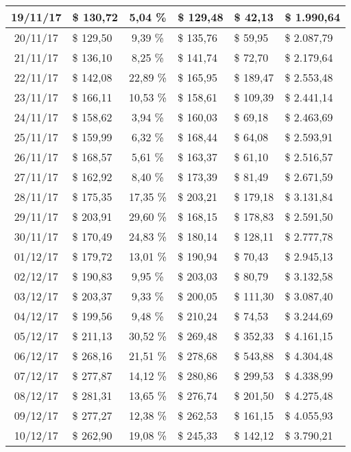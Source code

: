 \begin{center}
\begin{small}
\begin{longtable}{|c|l|c|l|l|l|}
19/11/17 & \$ 130,72 & 5,04 \% & \$ 129,48 & \$ 42,13 & \$ 1.990,64 \\ \hline
20/11/17 & \$ 129,50 & 9,39 \% & \$ 135,76 & \$ 59,95 & \$ 2.087,79 \\ \hline
21/11/17 & \$ 136,10 & 8,25 \% & \$ 141,74 & \$ 72,70 & \$ 2.179,64 \\ \hline
22/11/17 & \$ 142,08 & 22,89 \% & \$ 165,95 & \$ 189,47 & \$ 2.553,48 \\ \hline
23/11/17 & \$ 166,11 & 10,53 \% & \$ 158,61 & \$ 109,39 & \$ 2.441,14 \\ \hline
24/11/17 & \$ 158,62 & 3,94 \% & \$ 160,03 & \$ 69,18 & \$ 2.463,69 \\ \hline
25/11/17 & \$ 159,99 & 6,32 \% & \$ 168,44 & \$ 64,08 & \$ 2.593,91 \\ \hline
26/11/17 & \$ 168,57 & 5,61 \% & \$ 163,37 & \$ 61,10 & \$ 2.516,57 \\ \hline
27/11/17 & \$ 162,92 & 8,40 \% & \$ 173,39 & \$ 81,49 & \$ 2.671,59 \\ \hline
28/11/17 & \$ 175,35 & 17,35 \% & \$ 203,21 & \$ 179,18 & \$ 3.131,84 \\ \hline
29/11/17 & \$ 203,91 & 29,60 \% & \$ 168,15 & \$ 178,83 & \$ 2.591,50 \\ \hline
30/11/17 & \$ 170,49 & 24,83 \% & \$ 180,14 & \$ 128,11 & \$ 2.777,78 \\ \hline
01/12/17 & \$ 179,72 & 13,01 \% & \$ 190,94 & \$ 70,43 & \$ 2.945,13 \\ \hline
02/12/17 & \$ 190,83 & 9,95 \% & \$ 203,03 & \$ 80,79 & \$ 3.132,58 \\ \hline
03/12/17 & \$ 203,37 & 9,33 \% & \$ 200,05 & \$ 111,30 & \$ 3.087,40 \\ \hline
04/12/17 & \$ 199,56 & 9,48 \% & \$ 210,24 & \$ 74,53 & \$ 3.244,69 \\ \hline
05/12/17 & \$ 211,13 & 30,52 \% & \$ 269,48 & \$ 352,33 & \$ 4.161,15 \\ \hline
06/12/17 & \$ 268,16 & 21,51 \% & \$ 278,68 & \$ 543,88 & \$ 4.304,48 \\ \hline
07/12/17 & \$ 277,87 & 14,12 \% & \$ 280,86 & \$ 299,53 & \$ 4.338,99 \\ \hline
08/12/17 & \$ 281,31 & 13,65 \% & \$ 276,74 & \$ 201,50 & \$ 4.275,48 \\ \hline
09/12/17 & \$ 277,27 & 12,38 \% & \$ 262,53 & \$ 161,15 & \$ 4.055,93 \\ \hline
10/12/17 & \$ 262,90 & 19,08 \% & \$ 245,33 & \$ 142,12 & \$ 3.790,21 \\ \hline

\end{longtable}
\end{small}
\end{center}
